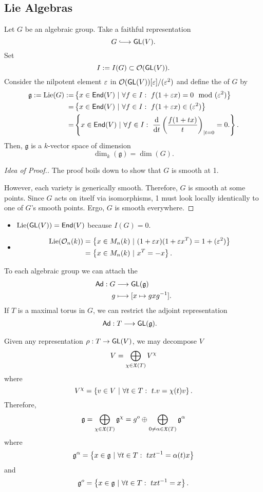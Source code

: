 \subsection{Lie Algebras}
\begin{lemma}[Fact]
	Let $G$ be an algebraic group. Take a faithful representation
	\[ G \Inj{} \GL(V). \]
	Set
	\[ I:= I(G) \subset \mathcal{O}(\textsf{GL}(V)). \]
	Consider the nilpotent element $\varepsilon$ in $\mathcal{O}(\textsf{GL}(V))[\varepsilon] / (\varepsilon^2)$ and
	define the  of $G$ by
	\begin{align*}
	\mathfrak{g} := \mathrm{Lie}(G) := &\left\lbrace x \in \textsf{End}(V) ~ | ~ \forall f \in I:~ f(1+\varepsilon x) = 0 \mod (\varepsilon^2)\right\rbrace\\
	= &\left\lbrace x \in \textsf{End}(V) ~ | ~ \forall f \in I:~ f(1+\varepsilon x) \in (\varepsilon^2)\right\rbrace\\
	= &\left\lbrace x \in \textsf{End}(V) ~ | ~ \forall f \in I:~ \frac{\mathrm{d}}{\mathrm{d} t}\left(\frac{f(1+t x)}{t}\right)_{|t = 0} = 0. \right\rbrace.
	\end{align*}
	Then, $\mathfrak{g}$ is a $k$-vector space of dimension
	\[ \dim_k(\mathfrak{g}) = \dim(G). \]
\end{lemma}
\begin{proof}[Idea of Proof.]
	The proof boils down to show that $G$ is smooth at 1.
	
	However, each variety is generically smooth. Therefore, $G$ is smooth at some points. Since $G$ acts on itself via isomorphisms, 1 must look locally identically to one of $G$'s smooth points. Ergo, $G$ is smooth everywhere.
\end{proof}
\begin{example}
	\begin{itemize}
		\item $\mathrm{Lie}(\textsf{GL}(V)) = \textsf{End}(V)$ because $I(G) = 0$.
		\item 
		\begin{align*}
		\mathrm{Lie}(\mathcal{O}_n(k)) &= \left\lbrace x \in M_n(k) ~ | ~  (1+\varepsilon x)(1+\varepsilon x^T) = 1 + (\varepsilon^2) \right\rbrace\\
		&= \left\lbrace x \in M_n(k) ~ | ~  x^T = -x \right\rbrace.
		\end{align*}
	\end{itemize}
\end{example}
\begin{definition}
	To each algebraic group we can attach the 
	\begin{align*}
	\textsf{Ad} : G &\overset{}{\longrightarrow} \textsf{GL}(\mathfrak{g})\\
	g &\longmapsto [x \mapsto gxg^{-1}].
	\end{align*}
	If $T$ is a maximal torus in $G$, we can restrict the adjoint representation
	\begin{align*}
	\textsf{Ad} : T &\overset{}{\longrightarrow} \textsf{GL}(\mathfrak{g}).
	\end{align*}
\end{definition}
Given any representation $\rho : T \overset{}{\rightarrow} \textsf{GL}(V)$, we may decompose $V$
\[ V = \bigoplus_{\chi \in \mathfrak{X}(T) } V^\chi \]
where
\[ V^\chi = \left\lbrace v\in V ~ | ~ \forall t \in T: ~t.v = \chi(t) v \right\rbrace. \]
Therefore,
\[ \mathfrak{g} = \bigoplus_{\chi \in \mathfrak{X}(T)} \mathfrak{g}^\chi = g^o \oplus \bigoplus_{0\neq \alpha \in \mathfrak{X}(T)} \mathfrak{g}^\alpha \]
where
\[ \mathfrak{g}^\alpha = \left\lbrace x \in \mathfrak{g} ~ | ~ \forall t \in T: ~txt^{-1} = \alpha(t) x \right\rbrace \]
and
\[ \mathfrak{g}^o = \left\lbrace x \in \mathfrak{g} ~ | ~ \forall t \in T: ~txt^{-1} =  x \right\rbrace. \]

